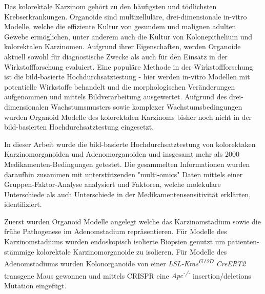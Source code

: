 Das kolorektale Karzinom gehört zu den häufigsten und tödlichsten Krebserkrankungen. Organoide sind multizelluläre, drei-dimensionale in-vitro Modelle, welche die effiziente Kultur von gesundem und malignen adulten Gewebe ermöglichen, unter anderem auch die Kultur von Kolonepithelium und kolorektalen Karzinomen. Aufgrund ihrer Eigenschaften, werden Organoide aktuell sowohl für diagnostische Zwecke als auch für den Einsatz in der Wirkstoffforschung evaluiert. Eine populäre Methode in der Wirkstoffforschung ist die bild-basierte Hochdurchsatztestung - hier werden in-vitro Modellen mit potentielle Wirkstoffe behandelt und die morphologischen Veränderungen aufgenommen und mittels Bildverarbeitung ausgewertet. Aufgrund des drei-dimensionalen Wachstumsmusters sowie komplexer Wachstumsbedingungen wurden Organoid Modelle des kolorektalen Karzinoms bisher noch nicht in der bild-basierten Hochdurchsatztestung eingesetzt. 
\bigbreak

In dieser Arbeit wurde die bild-basierte Hochdurchsatztestung von kolorektaken Karzinomorganoiden und Adenomorganoiden und insgesamt mehr als 2000 Medikamenten-Bedingungen getestet. Die gesammelten Informationen wurden daraufhin zusammen mit unterstützenden "multi-omics" Daten mittels einer Gruppen-Faktor-Analyse analysiert und Faktoren, welche molekulare Unterschiede als auch Unterschiede in der Medikamentensensitivität erklärten, identifiziert.
\bigbreak

Zuerst wurden Organoid Modelle angelegt welche das Karzinomstadium sowie die frühe Pathogenese im Adenomstadium repräsentieren. Für Modelle des Karzinomstadiums wurden endoskopisch isolierte Biopsien genutzt um patienten-stämmige kolorektale Karzinomorganoide zu isolieren. Für Modelle des Adenomstadiums wurden Kolonorganoide von einer \textit{LSL-Kras\textsuperscript{G12D} CreERT2} transgene Maus gewonnen und mittels CRISPR eine  \textit{Apc\textsuperscript{-/-}} insertion/deletions Mutation eingefügt.
\bigbreak

